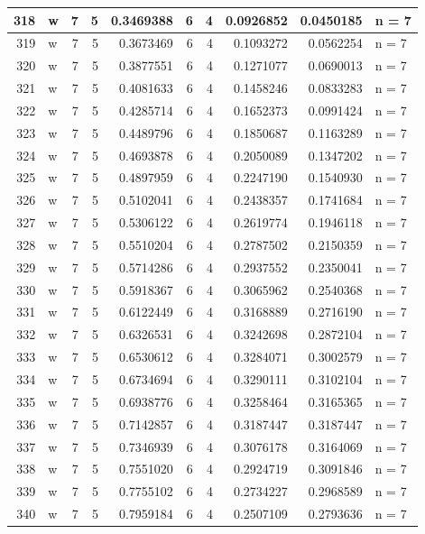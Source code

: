 \documentclass[
  letterpaper,
  DIV=11,
  numbers=noendperiod]{scrreprt}
\begin{document}
\begin{table}
\begin{tabular}[t]{r|l|r|r|r|r|r|r|r|l}
\hline
318 & w & 7 & 5 & 0.3469388 & 6 & 4 & 0.0926852 & 0.0450185 & n = 7\\
\hline
319 & w & 7 & 5 & 0.3673469 & 6 & 4 & 0.1093272 & 0.0562254 & n = 7\\
\hline
320 & w & 7 & 5 & 0.3877551 & 6 & 4 & 0.1271077 & 0.0690013 & n = 7\\
\hline
321 & w & 7 & 5 & 0.4081633 & 6 & 4 & 0.1458246 & 0.0833283 & n = 7\\
\hline
322 & w & 7 & 5 & 0.4285714 & 6 & 4 & 0.1652373 & 0.0991424 & n = 7\\
\hline
323 & w & 7 & 5 & 0.4489796 & 6 & 4 & 0.1850687 & 0.1163289 & n = 7\\
\hline
324 & w & 7 & 5 & 0.4693878 & 6 & 4 & 0.2050089 & 0.1347202 & n = 7\\
\hline
325 & w & 7 & 5 & 0.4897959 & 6 & 4 & 0.2247190 & 0.1540930 & n = 7\\
\hline
326 & w & 7 & 5 & 0.5102041 & 6 & 4 & 0.2438357 & 0.1741684 & n = 7\\
\hline
327 & w & 7 & 5 & 0.5306122 & 6 & 4 & 0.2619774 & 0.1946118 & n = 7\\
\hline
328 & w & 7 & 5 & 0.5510204 & 6 & 4 & 0.2787502 & 0.2150359 & n = 7\\
\hline
329 & w & 7 & 5 & 0.5714286 & 6 & 4 & 0.2937552 & 0.2350041 & n = 7\\
\hline
330 & w & 7 & 5 & 0.5918367 & 6 & 4 & 0.3065962 & 0.2540368 & n = 7\\
\hline
331 & w & 7 & 5 & 0.6122449 & 6 & 4 & 0.3168889 & 0.2716190 & n = 7\\
\hline
332 & w & 7 & 5 & 0.6326531 & 6 & 4 & 0.3242698 & 0.2872104 & n = 7\\
\hline
333 & w & 7 & 5 & 0.6530612 & 6 & 4 & 0.3284071 & 0.3002579 & n = 7\\
\hline
334 & w & 7 & 5 & 0.6734694 & 6 & 4 & 0.3290111 & 0.3102104 & n = 7\\
\hline
335 & w & 7 & 5 & 0.6938776 & 6 & 4 & 0.3258464 & 0.3165365 & n = 7\\
\hline
336 & w & 7 & 5 & 0.7142857 & 6 & 4 & 0.3187447 & 0.3187447 & n = 7\\
\hline
337 & w & 7 & 5 & 0.7346939 & 6 & 4 & 0.3076178 & 0.3164069 & n = 7\\
\hline
338 & w & 7 & 5 & 0.7551020 & 6 & 4 & 0.2924719 & 0.3091846 & n = 7\\
\hline
339 & w & 7 & 5 & 0.7755102 & 6 & 4 & 0.2734227 & 0.2968589 & n = 7\\
\hline
340 & w & 7 & 5 & 0.7959184 & 6 & 4 & 0.2507109 & 0.2793636 & n = 7\\

\end{tabular}
\end{table}
\end{document}
